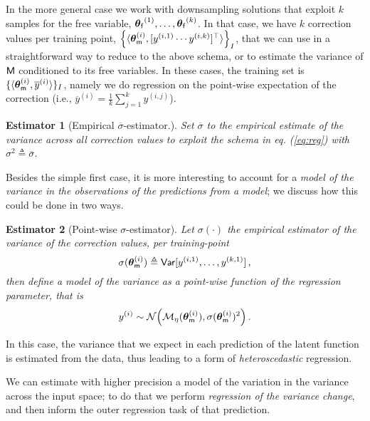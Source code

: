 \documentclass[runningheads,a4paper]{llncs}
\newtheorem{est}{Estimator}
\newcommand{\bM}{{\sf{M}}}
\newcommand{\bm}{{\sf{m}}}
\newcommand{\pfpar}{\bth_{\sf{f}}}
\newcommand{\rarg}[1]{{\bth_{\bm}^{(#1)}}}
\newcommand{\tstat}{\eta} %
\newcommand{\tmap}{{{\cal M}_\tstat}}
\newcommand{\bth}{\boldsymbol{\theta}}
\newcommand{\var}{{\sf Var}}
\begin{document}
In the more general case we work with downsampling solutions that exploit  $k$  samples for the free variable, ${\pfpar}^{(1)},\ldots, {\pfpar}^{(k)}$. In that case, we have  $k$  correction values per training point, 
$
\Big\{ \langle {\bth_{\bm}^{(i)}}, [y^{(i,1)}  \cdots y^{(i,k)}]^\top \rangle\Big\}_I
$,
that we can use in a straightforward way to reduce to the above schema, or to estimate the variance of $\bM$ conditioned to its free variables. In these cases, the training set is $\{ \langle {\bth_{\bm}^{(i)}}, \overline{y}^{(i)} \rangle \}_I$,
namely we do regression on the point-wise expectation of the correction (i.e., $\overline{y}^{(i)}= \frac{1}{k}\sum_{j=1}^k y^{(i,j)}$).

\begin{est}[Empirical $\overline{\sigma}$-estimator.] Set $\overline{\sigma}$ to the empirical estimate of the variance {\em across all correction values}  to exploit  the schema in eq. (\ref{eq:reg}) with $\sigma^2 \triangleq \overline{\sigma}$.
\end{est}



Besides  the simple first case, it  is more interesting to account for a {\em model of the variance in the observations of the predictions from a model}; we discuss how this could be done in two ways.


\begin{est}[Point-wise $\sigma$-estimator] Let $\sigma(\cdot)$ the {\em empirical estimator} of the variance of the correction values, per training-point
\begin{equation}\label{eq:empvar}
\sigma(\rarg{i}) \triangleq \var[y^{(i,1)}, \ldots, y^{(k,1)}] \, ,
\end{equation}
then define a model of the variance as a point-wise function of the regression parameter, that is
\begin{equation}\label{eq:sreg}
y^{(i)} \sim {\cal N}\Big (\tmap(\rarg{i}),   \sigma(\rarg{i})^2\Big) \, .
\end{equation}
\end{est}
In this case, the variance that we expect in each prediction of the latent function is  estimated from the data, thus leading to a form of {\em heteroscedastic} regression.

We can estimate with higher precision a model of the variation in the variance across the input space; to do that we  perform {\em regression of the variance change}, and then inform the outer regression task of that prediction.
\end{document}
